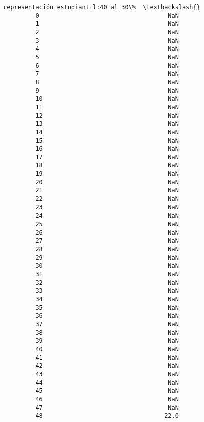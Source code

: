 \documentclass[11pt]{article}
\begin{document}
\begin{Verbatim}[commandchars=\\\{\}]
             representación estudiantil:40 al 30\%  \textbackslash{}
         0                                    NaN   
         1                                    NaN   
         2                                    NaN   
         3                                    NaN   
         4                                    NaN   
         5                                    NaN   
         6                                    NaN   
         7                                    NaN   
         8                                    NaN   
         9                                    NaN   
         10                                   NaN   
         11                                   NaN   
         12                                   NaN   
         13                                   NaN   
         14                                   NaN   
         15                                   NaN   
         16                                   NaN   
         17                                   NaN   
         18                                   NaN   
         19                                   NaN   
         20                                   NaN   
         21                                   NaN   
         22                                   NaN   
         23                                   NaN   
         24                                   NaN   
         25                                   NaN   
         26                                   NaN   
         27                                   NaN   
         28                                   NaN   
         29                                   NaN   
         30                                   NaN   
         31                                   NaN   
         32                                   NaN   
         33                                   NaN   
         34                                   NaN   
         35                                   NaN   
         36                                   NaN   
         37                                   NaN   
         38                                   NaN   
         39                                   NaN   
         40                                   NaN   
         41                                   NaN   
         42                                   NaN   
         43                                   NaN   
         44                                   NaN   
         45                                   NaN   
         46                                   NaN   
         47                                   NaN   
         48                                  22.0   
         

\end{Verbatim}
\end{document}
